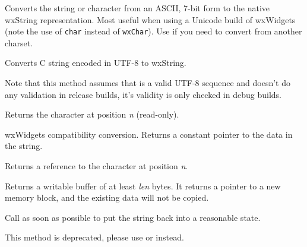 
Converts the string or character from an ASCII, 7-bit form
to the native wxString representation. Most useful when using
a Unicode build of wxWidgets (note the use of {\tt char} instead of {\tt wxChar}).
Use  if you
need to convert from another charset.


\label{wxstringfromutf8}



Converts C string encoded in UTF-8 to wxString.

Note that this method assumes that  is a valid UTF-8 sequence and
doesn't do any validation in release builds, it's validity is only checked in
debug builds.


\label{wxstringgetchar}


Returns the character at position {\it n} (read-only).


\label{wxstringgetdata}


wxWidgets compatibility conversion. Returns a constant pointer to the data in the string.


\label{wxstringgetwritablechar}


Returns a reference to the character at position {\it n}.


\label{wxstringgetwritebuf}


Returns a writable buffer of at least {\it len} bytes.
It returns a pointer to a new memory block, and the
existing data will not be copied.

Call  as soon as
possible to put the string back into a reasonable state.

This method is deprecated, please use
 or
 instead.


